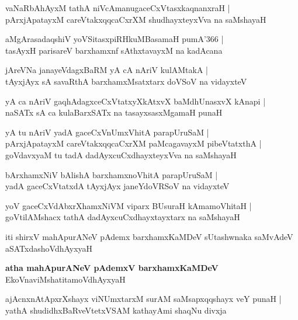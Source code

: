 \begin{shloka}
vaNaRbAhAyxM tathA niVcAmanugaceCxVtasxkaqnanxraH |\\
pArxjApatayxM careVtakxqqcaCxrXM shudhayxteyxVva na saMshayaH 
\end{shloka}

\begin{shloka}
aMgArasadaqshiV yoVSitasxpiRHkuMBasamaH pumA\char'366 |\\
tasAyxH parisareV barxhamxnf sAthxtavayxM na kadAcana
\end{shloka}

\begin{shloka}
jAreVNa janayeVdagxBaRM yA cA nAriV kulAMtakA |\\
tAyxjAyx sA savaRthA barxhamxMsatxtarx doVSoV na vidayxteV 
\end{shloka}

\begin{shloka}
yA ca nAriV gaqhAdagxceCxVtatxyXkAtxvX baMdhUnasxvX kAnapi |\\
naSATx sA ca kulaBarxSATx na tasayxsasxMgamaH punaH
\end{shloka}

\begin{shloka}
yA tu nAriV yadA gaceCxVnUmxVhitA parapUruSaM |\\
pArxjApatayxM careVtakxqqcaCxrXM paMcagavayxM pibeVtatxthA |\\
goVdavxyaM tu tadA dadAyxcuCxdhayxteyxVva na saMshayaH 
\end{shloka}

\begin{shloka}
bArxhamxNiV bAlishA barxhamxnoVhitA parapUruSaM |\\
yadA gaceCxVtatxdA tAyxjAyx janeYdoVRSoV na vidayxteV 
\end{shloka}

\begin{shloka}
yoV gaceCxVdAbxrXhamxNiVM viparx BUsuraH kAmamoVhitaH |\\
goVtilAMshacx tathA dadAyxcuCxdhayxtayxtarx na saMshayaH 
\end{shloka}
iti shirxV mahApurANeV pAdemx barxhamxKaMDeV sUtashwnaka saMvAdeV aSATxdashoVdhAyxyaH

\begin{center}
\textbf{\large atha mahApurANeV pAdemxV barxhamxKaMDeV}\\
EkoVnaviMshatitamoVdhAyxyaH
\end{center}

\setcounter{shloka}{0}
\begin{shloka}
ajAcnxnAtApxrXshayx viNUmxtarxM surAM saMsapxqqshayx veY punaH |\\
yathA shudidhxBaRveVtetxVSAM kathayAmi shaqNu divxja
\end{shloka}

